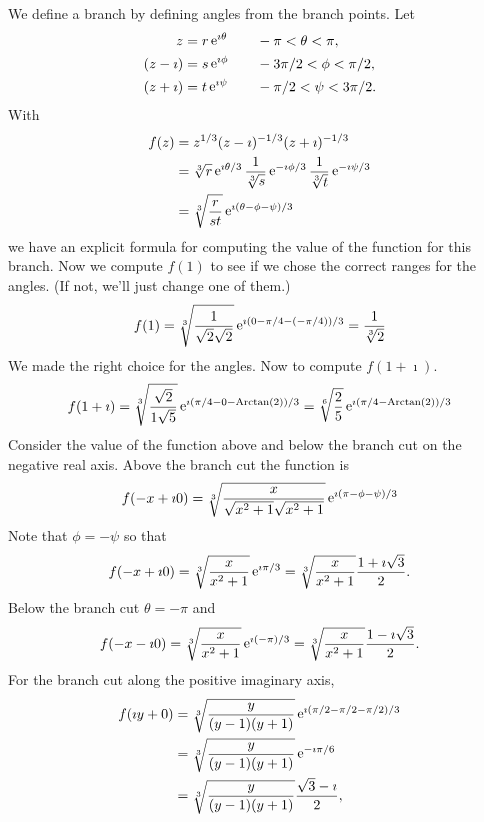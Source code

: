 {\begin{Solution}
  We define a branch by defining angles from the branch points.  Let
  \begin{alignat*}{2}
    z &= r \mathop{\mathrm{e}}\nolimits^{\imath \theta} &\quad &-\pi < \theta < \pi, 
    \\
    (z - \imath) &= s \mathop{\mathrm{e}}\nolimits^{\imath \phi} &\quad &-3 \pi/2 < \phi < \pi/2, 
    \\
    (z + \imath) &= t \mathop{\mathrm{e}}\nolimits^{\imath \psi} &\quad &-\pi/2 < \psi < 3 \pi/2.
  \end{alignat*}
  With
  \begin{align*}
    f(z)
    &= z^{1/3}  (z - \imath)^{-1/3}  (z + \imath)^{-1/3} 
    \\
    &= \sqrt[3]{r} \mathop{\mathrm{e}}\nolimits^{\imath \theta/3} 
    \frac{1}{\sqrt[3]{s}} \mathop{\mathrm{e}}\nolimits^{-\imath \phi/3} 
    \frac{1}{\sqrt[3]{t}} \mathop{\mathrm{e}}\nolimits^{-\imath \psi/3} 
    \\
    &= \sqrt[3]{ \frac{r}{s t} } \mathop{\mathrm{e}}\nolimits^{ \imath (\theta - \phi - \psi) / 3}
  \end{align*}
  we have an explicit formula for computing the value of the function for this
  branch.  Now we compute $f(1)$ to see if we chose the correct ranges for the
  angles.  (If not, we'll just change one of them.)
  \[
  f(1) = \sqrt[3]{ \frac{1}{\sqrt{2} \sqrt{2}} }
  \mathop{\mathrm{e}}\nolimits^{ \imath (0 - \pi/4 - (-\pi/4))/3}
  = \frac{1}{\sqrt[3]{2}}
  \]
  We made the right choice for the angles.  Now to compute $f(1 + \imath)$.
  \[
  f(1 + \imath) = \sqrt[3]{ \frac{\sqrt{2}}{1 \sqrt{5}} }
  \mathop{\mathrm{e}}\nolimits^{\imath (\pi/4 - 0 - \mathop{\mathrm{Arctan}}\nolimits(2))/3}
  = \sqrt[6]{ \frac{2}{5} } \mathop{\mathrm{e}}\nolimits^{\imath (\pi/4  - \mathop{\mathrm{Arctan}}\nolimits(2))/3}
  \]
  Consider the value of the function above and below the branch cut on the
  negative real axis.  Above the branch cut the function is
  \[
  f(-x + \imath 0) = \sqrt[3]{ \frac{x}{\sqrt{x^2+1} \sqrt{x^2+1}}} \mathop{\mathrm{e}}\nolimits^{\imath (\pi - \phi - \psi)/3}
  \]
  Note that $\phi = - \psi$ so that
  \[
  f(-x + \imath 0) = \sqrt[3]{ \frac{x}{x^2+1} } \mathop{\mathrm{e}}\nolimits^{\imath \pi/3}
  = \sqrt[3]{ \frac{x}{x^2+1} } \frac{1 + \imath \sqrt{3}}{2}.
  \]
  Below the branch cut $\theta = - \pi$ and
  \[
  f(-x - \imath 0) = \sqrt[3]{ \frac{x}{x^2+1} } \mathop{\mathrm{e}}\nolimits^{\imath (-\pi )/3}
  = \sqrt[3]{ \frac{x}{x^2+1} } \frac{1 - \imath \sqrt{3}}{2}.
  \]
  For the branch cut along the positive imaginary axis,
  \begin{align*}
    f(\imath y + 0) &= \sqrt[3]{ \frac{y}{(y-1) (y+1)} } 
    \e^{\imath (\pi/2 - \pi/2 - \pi/2)/3} 
    \\
    &= \sqrt[3]{ \frac{y}{(y-1) (y+1)} } \e^{- \imath \pi/6} 
    \\
    &= \sqrt[3]{ \frac{y}{(y-1) (y+1)} } \frac{\sqrt{3} - \imath}{2},

\end{align*}
\end{Solution}}
